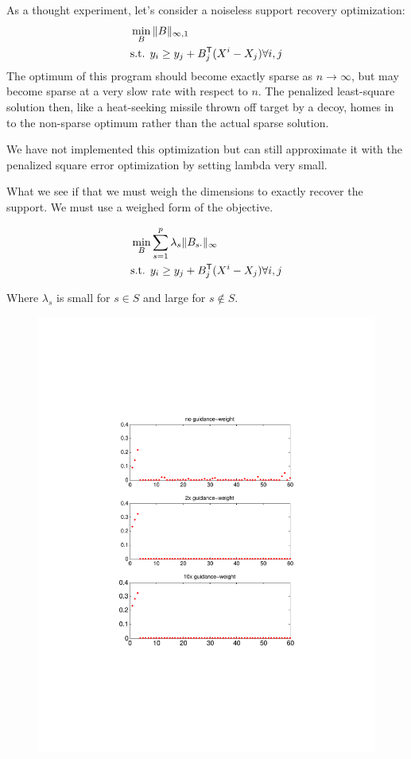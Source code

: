 \documentclass{article}
\begin{document}
As a thought experiment, let's consider a noiseless support recovery optimization:
\begin{align*}
& \min_B \| B \|_{\infty, 1}\\
&\textrm{s.t. } y_i \geq y_j + B_j^{\mathsf{T}} (X^i - X_j) \forall i,j
\end{align*}
The optimum of this program should become exactly sparse as $n \rightarrow \infty$, but may become sparse at a very slow rate with respect to $n$. The penalized least-square solution then, like a heat-seeking missile thrown off target by a decoy, homes in to the non-sparse optimum rather than the actual sparse solution.

We have not implemented this optimization but can still approximate it with the penalized square error optimization by setting lambda very small.

What we see if that we must weigh the dimensions to exactly recover the support. We must use a weighed form of the objective.

\begin{align*}
& \min_B \sum_{s=1}^p \lambda_s\| B_{s\cdot} \|_{\infty}\\
&\textrm{s.t. } y_i \geq y_j + B_j^{\mathsf{T}} (X^i - X_j) \forall i,j
\end{align*}

Where $\lambda_s$ is small for $s \in S$ and large for $s \notin S$. 

\begin{figure}
\includegraphics[trim= 150 200 150 200]{../code/figs/guided_recovery.pdf}
\end{figure}
\end{document}
